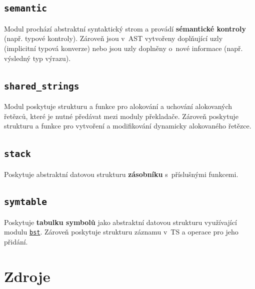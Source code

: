 \documentclass[a4paper, 11pt]{article}
\begin{document}
    \vspace{-1em}
    \subsection{\texttt{semantic}}
    \label{module:semantic}
    \vspace{-0.5em}
        Modul prochází abstraktní syntaktický strom a provádí \textbf{sémantické kontroly}
        (např. typové kontroly).
        Zároveň jsou v~AST vytvořeny doplňující uzly (implicitní typová konverze) nebo jsou uzly doplněny o~nové
        informace (např. výsledný typ výrazu).

    \vspace{-1em}
    \subsection{\texttt{shared\_strings}}
    \label{module:strings}
    \vspace{-0.5em}
        Modul poskytuje strukturu a funkce pro alokování a uchování alokovaných řetězců,
        které je nutné předávat mezi moduly překladače.
        Zároveň poskytuje strukturu a funkce pro vytvoření a modifikování dynamicky alokovaného řetězce.

    \vspace{-1em}
    \subsection{\texttt{stack}}
    \label{module:stack}
    \vspace{-0.5em}
        Poskytuje abstraktní datovou strukturu \textbf{zásobníku} s~příslušnými funkcemi.

    \vspace{-1em}
    \subsection{\texttt{symtable}}
    \label{module:symtable}
    \vspace{-0.5em}
        Poskytuje \textbf{tabulku symbolů} jako abstraktní datovou strukturu využívající modulu
        \hyperref[module:bst]{\texttt{bst}}. Zároveň poskytuje strukturu záznamu v~TS a operace pro jeho
        přidání.

    \section{Zdroje}

    \renewcommand{\refname}{}
    \nocite{*}
    
    
\end{document}
